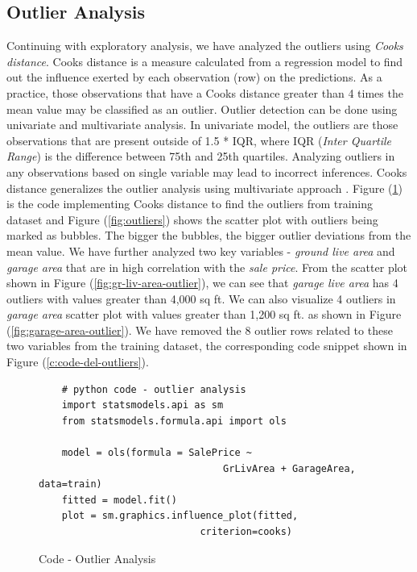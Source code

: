 \documentclass[sigconf]{acmart}
\begin{document}
	\subsection{Outlier Analysis}
	
	Continuing with exploratory analysis, we have analyzed the outliers using {\em Cooks distance}. Cooks distance is a measure calculated from a regression model to find out the influence exerted by each observation (row) on the predictions. As a practice,  those observations that have a Cooks distance greater than 4 times the mean value may be classified as an outlier. Outlier detection can be done using univariate and multivariate analysis. In univariate model, the outliers are those observations that are present outside of 1.5 * IQR, where IQR ({\em Inter Quartile Range}) is the difference between 75th and 25th quartiles. Analyzing outliers in any observations based on single variable may lead to incorrect inferences. Cooks distance generalizes the outlier analysis using multivariate approach \cite{1}. Figure (\ref{c:code-outliers}) is the code implementing Cooks distance to find the outliers from training dataset and Figure (\ref{fig:outliers}) shows the scatter plot with outliers being marked as bubbles. The bigger the bubbles, the bigger outlier deviations from the mean value. We have further analyzed two key variables - {\em ground live area} and {\em garage area} that are in high correlation with the {\em sale price}. From the scatter plot shown in Figure (\ref{fig:gr-liv-area-outlier}), we can see that {\em garage live area} has 4 outliers with values greater than 4,000 sq ft. We can also visualize 4 outliers in {\em garage area} scatter plot with values greater than 1,200 sq ft. as shown in Figure (\ref{fig:garage-area-outlier}).  We have removed the 8 outlier rows related to these two variables from the training dataset, the corresponding code snippet shown in Figure (\ref{c:code-del-outliers}).
	
	\begin{figure}[htb]		
	\begin{verbatim}	
	# python code - outlier analysis
	import statsmodels.api as sm
	from statsmodels.formula.api import ols
	
	model = ols(formula = SalePrice ~ 
								GrLivArea + GarageArea, data=train)
	fitted = model.fit()    	
	plot = sm.graphics.influence_plot(fitted, 
							criterion=cooks)		
	\end{verbatim}
	\caption{Code - Outlier Analysis} \label{c:code-outliers} 
	\end{figure}
\end{document}
